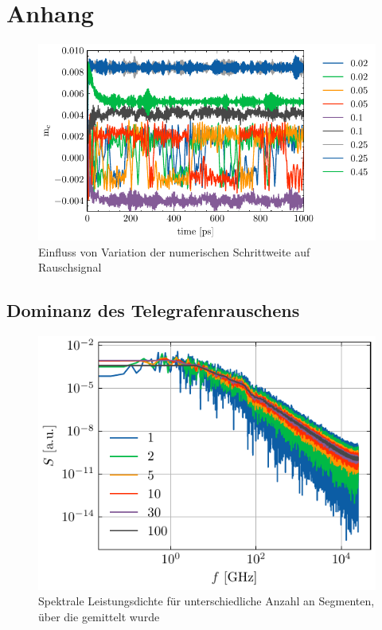 \documentclass[main.tex]{subfiles}
\begin{document}
\newpage
\section{Anhang}

\begin{figure}[H]
    \centering
    \includegraphics{bilder/plots/dh_variation/mc_time.pdf}
    \caption{Einfluss von Variation der numerischen Schrittweite  auf Rauschsignal }\label{fig:dh-variation}
\end{figure}

\subsection{Dominanz des Telegrafenrauschens}
\begin{figure}[H]
    \centering
    \includegraphics{bilder/plots/Bz_0mT/spectral_power_densities_segments_26.03meV.pdf}
    \caption{Spektrale Leistungsdichte für unterschiedliche Anzahl an Segmenten, über die gemittelt wurde}\label{fig:spd-seg}
\end{figure}
\end{document}
